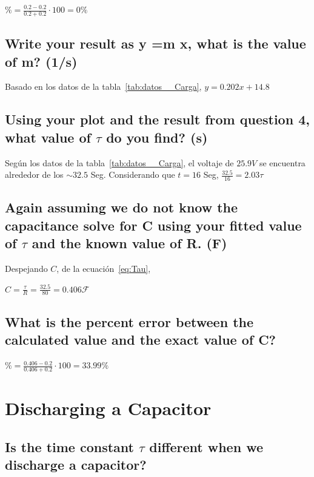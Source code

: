 \documentclass[twocolumn, 12pt]{article}
\begin{document}
$\% = \frac{0.2 - 0.2}{0.2 + 0.2} \cdot 100 = 0\%$

\subsection{Write your result as y =m x, what is the value of m? (1/s)}

Basado en los datos de la tabla~\ref{tab:datos__Carga}, $y
    = 0.202x + 14.8$

\subsection{Using your plot and the result from question 4, what value of $\tau$ do you find? (s)}

Según los datos de la tabla~\ref{tab:datos__Carga}, el
voltaje de $25.9V$ se encuentra alrededor de los $\sim
    32.5$ Seg. Considerando que $t = 16$ Seg, $\frac{32.5}{16}
    = 2.03 \tau$

\subsection{Again assuming we do not know the capacitance solve for C using your fitted value of $\tau$
    and the known value of R. (F)}

Despejando $C$, de la ecuación~\eqref{eq:Tau},

$C = \frac{\tau}{R} = \frac{32.5}{80} = 0.406 \mathcal{F}$

\subsection{What is the percent error between the calculated value and the exact value of C?}

$\% = \frac{0.406 - 0.2}{0.406 + 0.2} \cdot 100 = 33.99\%$

\section{Discharging a Capacitor}

\subsection{Is the time constant $\tau$ different when we discharge a capacitor?}
\end{document}
